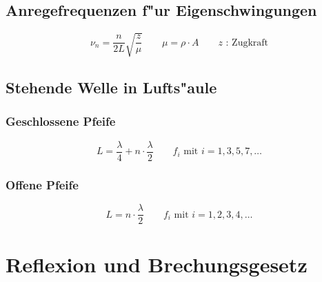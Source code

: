 \subsection{Anregefrequenzen f"ur Eigenschwingungen}
\begin{equation}
	\nu_n=\frac{n}{2L}\sqrt{\frac{z}{\mu}}\qquad\mu=\rho\cdot A\qquad z\text{ : Zugkraft}
\end{equation}

\subsection{Stehende Welle in Lufts"aule}

\subsubsection{Geschlossene Pfeife}
\begin{equation}
	L=\frac{\lambda}{4}+n\cdot\frac{\lambda}{2}\qquad f_i\text{ mit } i=1,3,5,7,\ldots
\end{equation}

\subsubsection{Offene Pfeife}
\begin{equation}
	L=n\cdot\frac{\lambda}{2}\qquad f_i\text{ mit } i=1,2,3,4,\ldots
\end{equation}

\section{Reflexion und Brechungsgesetz}

